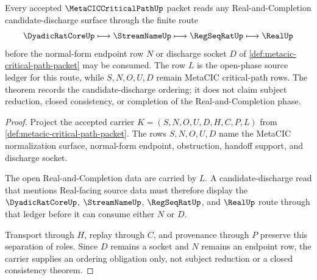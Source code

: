 \begin{theorem}
\label{thm:metacic-critical-path-l10-candidate-discharge-order}
Every accepted $\MetaCICCriticalPathUp$ packet reads any Real-and-Completion candidate-discharge surface through the finite route
$$
\DyadicRatCoreUp \longmapsto \StreamNameUp \longmapsto \RegSeqRatUp \longmapsto \RealUp
$$
before the normal-form endpoint row $N$ or discharge socket $D$ of \autoref{def:metacic-critical-path-packet} may be consumed. The row $L$ is the open-phase source ledger for this route, while $S,N,O,U,D$ remain MetaCIC critical-path rows. The theorem records the candidate-discharge ordering; it does not claim subject reduction, closed consistency, or completion of the Real-and-Completion phase.
\end{theorem}
\begin{proof}
Project the accepted carrier $K=(S,N,O,U,D,H,C,P,L)$ from \autoref{def:metacic-critical-path-packet}. The rows $S,N,O,U,D$ name the MetaCIC normalization surface, normal-form endpoint, obstruction, handoff support, and discharge socket.

The open Real-and-Completion data are carried by $L$. A candidate-discharge read that mentions Real-facing source data must therefore display the $\DyadicRatCoreUp$, $\StreamNameUp$, $\RegSeqRatUp$, and $\RealUp$ route through that ledger before it can consume either $N$ or $D$.

Transport through $H$, replay through $C$, and provenance through $P$ preserve this separation of roles. Since $D$ remains a socket and $N$ remains an endpoint row, the carrier supplies an ordering obligation only, not subject reduction or a closed consistency theorem.
\end{proof}
